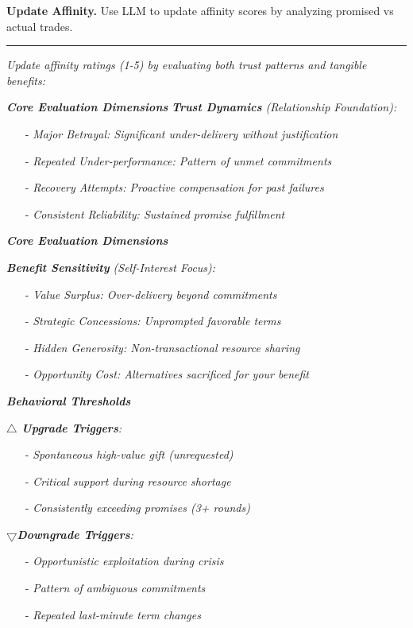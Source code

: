 \textbf{Update Affinity.} Use LLM to update affinity scores by analyzing promised vs actual trades.
\noindent\rule{\linewidth}{0.8pt}
\textit{Update affinity ratings (1-5) by evaluating both trust patterns and tangible benefits:}

\textbf{\textit{Core Evaluation Dimensions}}
\textit{\textbf{Trust Dynamics} (Relationship Foundation):}
\begin{itemize}
    \item[-] \textit{Major Betrayal: Significant under-delivery without justification}
    \item[-] \textit{Repeated Under-performance: Pattern of unmet commitments}
    \item[-] \textit{Recovery Attempts: Proactive compensation for past failures}
    \item[-] \textit{Consistent Reliability: Sustained promise fulfillment}
\end{itemize}

\textbf{\textit{Core Evaluation Dimensions}}

\textit{\textbf{Benefit Sensitivity} (Self-Interest Focus):}
\begin{itemize}
    \item[-] \textit{Value Surplus: Over-delivery beyond commitments}
    \item[-] \textit{Strategic Concessions: Unprompted favorable terms}
    \item[-] \textit{Hidden Generosity: Non-transactional resource sharing}
    \item[-] \textit{Opportunity Cost: Alternatives sacrificed for your benefit}
\end{itemize}

\textbf{\textit{Behavioral Thresholds}}

\textit{\textbf{$\bigtriangleup$ Upgrade Triggers}:}
\begin{itemize}
    \item[-] \textit{Spontaneous high-value gift (unrequested)}
    \item[-] \textit{Critical support during resource shortage}
    \item[-] \textit{Consistently exceeding promises (3+ rounds)}
\end{itemize}

\textit{$\bigtriangledown$\textbf{Downgrade Triggers}:}
\begin{itemize}
    \item[-] \textit{Opportunistic exploitation during crisis}
    \item[-] \textit{Pattern of ambiguous commitments}
    \item[-] \textit{Repeated last-minute term changes}
\end{itemize}

